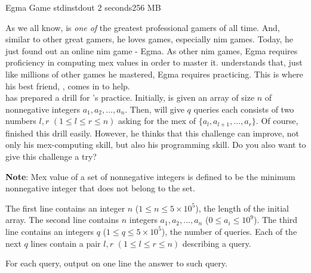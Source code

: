 \begin{problem}{Egma Game}
{stdin}{stdout}
{2 seconds}{256 MB}{}

As we all know, \TiChuot is \textit{one of} the greatest professional gamers of all time. And, similar to other great gamers, he loves games,
especially nim games. Today, he just found out an online nim game - Egma. As other nim games, Egma requires proficiency in computing mex values
in order to master it. \TiChuot understands that, just like millions of other games he mastered, Egma requires practicing. This is where his
best friend, \T, comes in to help.\\

\T has prepared a drill for \TiChuot's practice. Initially, \TiChuot is given an array of size $n$ of nonnegative integers $a_1, a_2, ..., a_n$.
Then, \T will give \TiChuot $q$ queries each consists of two numbers $l, r$ $(1 \leq l \leq r \leq n)$ asking for the mex of $\{a_l, a_{l + 1},
..., a_r\}$. Of course, \TiChuot finished this drill easily. However, he thinks that this challenge can improve, not only his mex-computing skill,
but also his programming skill. Do you also want to give this challenge a try?

\textbf{Note}: Mex value of a set of nonnegative integers is defined to be the minimum nonnegative integer that does not belong to the set.

\InputFile
The first line contains an integer $n$ ($1 \leq n \leq 5\times10^5$), the length of the initial array. The second line contains $n$ integers $a_1,
a_2, ..., a_n$ ($0 \leq a_i \leq 10^9$). The third line contains an integers $q$ ($1 \leq q \leq 5\times10^5$), the number of queries. Each of the
next $q$ lines contain a pair $l, r$ $(1 \leq l \leq r \leq n)$ describing a query.

\OutputFile

For each query, output on one line the answer to such query.

\Examples

\begin{example}
%
\end{example}

\end{problem}
